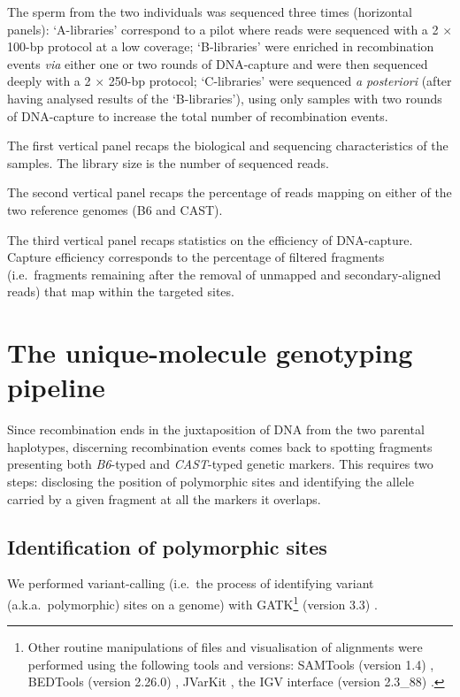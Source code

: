 \begin{sidewaystable}[p]
{		\par The sperm from the two individuals was sequenced three times (horizontal panels): ‘A-libraries’ correspond to a pilot where reads were sequenced with a 2 $\times$ 100-bp protocol at a low coverage; ‘B-libraries’ were enriched in recombination events \textit{via} either one or two rounds of DNA-capture and were then sequenced deeply with a 2 $\times$ 250-bp protocol; ‘C-libraries’ were sequenced \textit{a posteriori} (after having analysed results of the ‘B-libraries’), using only samples with two rounds of DNA-capture to increase the total number of recombination events.
		\par The first vertical panel recaps the biological and sequencing characteristics of the samples. 
		The library size is the number of sequenced reads.
		\par The second vertical panel recaps the percentage of reads mapping on either of the two reference genomes (B6 and CAST).
		\par The third vertical panel recaps statistics on the efficiency of DNA-capture.
		Capture efficiency corresponds to the percentage of filtered fragments (i.e.\ fragments remaining after the removal of unmapped and secondary-aligned reads) that map within the targeted sites.
	}
\label{tab:characteristics-seq-mapping-capture}
\end{sidewaystable}





\section{The unique-molecule genotyping pipeline}
\label{sec:pipeline}

Since recombination ends in the juxtaposition of DNA from the two parental haplotypes, discerning recombination events comes back to spotting fragments presenting both \textit{B6}-typed and \textit{CAST}-typed genetic markers.
This requires two steps: disclosing the position of polymorphic sites and identifying the allele carried by a given fragment at all the markers it overlaps.


\subsection{Identification of polymorphic sites}

We performed variant-calling (i.e.\ the process of identifying variant (a.k.a.\ polymorphic) sites on a genome) with GATK\footnote{Other routine manipulations of files and visualisation of alignments were performed using the following tools and versions: SAMTools (version 1.4) \citep{li2009sequence}, BEDTools (version 2.26.0) \citep{quinlan2010bedtools}, JVarKit \citep{lindenbaum2015jvarkit}, the IGV interface (version 2.3\_88) \citep{robinson2011integrative}.} (version 3.3) \citep{mckenna2010genome}.

